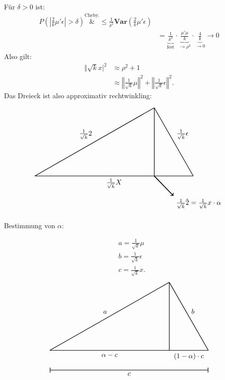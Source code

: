 \documentclass[10pt]{article}
\newcommand{\Var}{\textbf{Var}} %
\begin{document}
	Für $\delta >0$ ist:
	\begin{equation*}
		\begin{split}
			P\left(\left\vert \frac{2}{k} \mu' \epsilon \right\vert > \delta \right) \overset{\text{Cheby.}}&{\leq} \frac{1}{\delta^2} \Var\left(\frac{2}{k} \mu' \epsilon \right)\\
			&= \underbrace{\frac{1}{\delta^2}}_{\text{fest}} \cdot \underbrace{\frac{\mu' \mu}{k}}_{\rightarrow \rho^2} \cdot \underbrace{\frac{4}{k}}_{\rightarrow 0} \rightarrow 0
		\end{split}
	\end{equation*}
	Also gilt:
	\begin{equation*}
		\begin{split}
			\Vert \sqrt{k}x\vert^2 &\approx \rho^2+1\\
				&\approx \left\Vert \frac{1}{\sqrt{k}}\mu\right\Vert^2 + \left\Vert \frac{1}{\sqrt{k}} \epsilon \right\Vert^2.
		\end{split}
	\end{equation*}
	Das Dreieck ist also approximativ rechtwinkling: 
	
	\begin{align*}
		\begin{tikzpicture}
			\draw[thick, -] (0,0) -- node[midway, above left] {$\frac{1}{\sqrt{k}}\mu$} (6.029836,3.446703);
			\draw[thick, -] (6.029836,3.446703) -- node[midway, above right] {$\frac{1}{\sqrt{k}}\epsilon$} (8,0);
			\draw[thick, -] (0,0) -- node[midway, below] {$\frac{1}{\sqrt{k}}X$} (8,0);
			\draw[thick, -] (6.029836,0) -- (6.029836,3.446703);
			\draw[very thick, ->] (6.029836,0) -- (7,-1) node[below right] {$\frac{1}{\sqrt{k}} \hat{\mu} = \frac{1}{\sqrt{k}} x \cdot \alpha$};
		\end{tikzpicture}
	\end{align*}	
	
	Bestimmung von $\alpha$:
	
	\begin{equation*}
		\begin{split}
			&a = \frac{1}{\sqrt{k}} \mu\\
			&b = \frac{1}{\sqrt{k}} \epsilon\\
			&c = \frac{1}{\sqrt{k}} x.
		\end{split}
	\end{equation*}
		\begin{align*}
		\begin{tikzpicture}
			\draw[thick, -] (0,0) -- node[midway, above left] {$a$} (6.029836,3.446703);
			\draw[thick, -] (6.029836,3.446703) -- node[midway, above right] {$b$} (8,0);
			\draw[thick, -] (0,0) -- node[midway, below] {$\alpha - c$} (6.029863,0);
			\draw[thick, -] (6.029863,0) -- node[midway, below] {$(1- \alpha) \cdot c$} (8,0);
			\draw[thick, -] (6.029836,0) -- (6.029836,3.446703);
			\draw[thick, |-|] (0,-1) --node[midway, below] {$c$} (8,-1);
		\end{tikzpicture}
	\end{align*}
	
\end{document}
